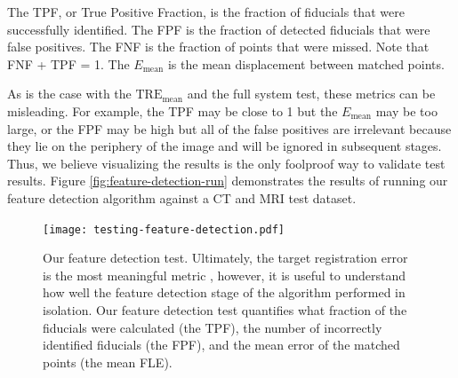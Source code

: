 \documentclass[12pt]{article}
\begin{document}
The TPF, or True Positive Fraction, is the fraction of fiducials that were successfully identified.  The FPF is the fraction of detected fiducials that were false positives.  The FNF is the fraction of points that were missed.  Note that FNF + TPF = 1.  The $E_\textrm{mean}$ is the mean displacement between matched points.

As is the case with the $\textrm{TRE}_\textrm{mean}$ and the full system test, these metrics can be misleading.  For example, the TPF may be close to 1 but the $E_\textrm{mean}$ may be too large, or the FPF may be high but all of the false positives are irrelevant because they lie on the periphery of the image and will be ignored in subsequent stages.  Thus, we believe visualizing the results is the only foolproof way to validate test results.  Figure \ref{fig:feature-detection-run} demonstrates the results of running our feature detection algorithm against a CT and MRI test dataset.

\begin{figure}
    \centering
    \texttt{[image: testing-feature-detection.pdf]}
    \caption{Our feature detection test.  Ultimately, the target registration error is the most meaningful metric \cite[page R38]{hill2001}, however, it is useful to understand how well the feature detection stage of the algorithm performed in isolation.  Our feature detection test quantifies what fraction of the fiducials were calculated (the TPF), the number of incorrectly identified fiducials (the FPF), and the mean error of the matched points (the mean FLE).}
    \label{fig:testing-feature-detection}
\end{figure}
\end{document}
